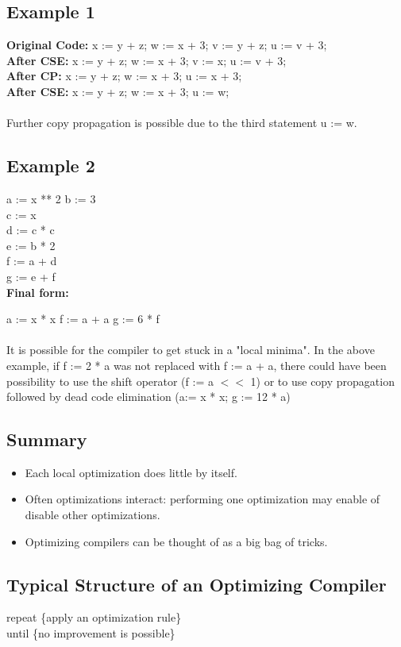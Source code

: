 \subsection{Example 1}

\textbf{Original Code:} x := y + z; w := x + 3; v := y + z; u := v + 3;\\
\textbf{After CSE:} x := y + z; w := x + 3; v := x; u := v + 3;\\
\textbf{After CP:} x := y + z; w := x + 3; u := x + 3;\\
\textbf{After CSE:} x := y + z; w := x + 3; u := w;\\
\\
Further copy propagation is possible due to the third statement u := w.

\subsection{Example 2}

a := x ** 2
b := 3\\
c := x\\
d := c * c\\
e := b * 2\\
f := a + d\\
g := e + f\\

\textbf{Final form: }

a := x * x
f := a + a
g := 6 * f\\
\\
It is possible for the compiler to get stuck in a "local minima". In the above example, if f := 2 * a was not replaced with f := a + a, there could have been possibility to use the shift operator (f := a \(<<\) 1) or to use copy propagation followed by dead code elimination (a:= x * x; g := 12 * a)

\subsection{Summary}
\begin{itemize}
    \item Each local optimization does little by itself.
    \item Often optimizations interact: performing one optimization may enable of disable other optimizations.
    \item Optimizing compilers can be thought of as a big bag of tricks.
\end{itemize}

\subsection{Typical Structure of an Optimizing Compiler}
repeat \{apply an optimization rule\}\\
until \{no improvement is possible\}

